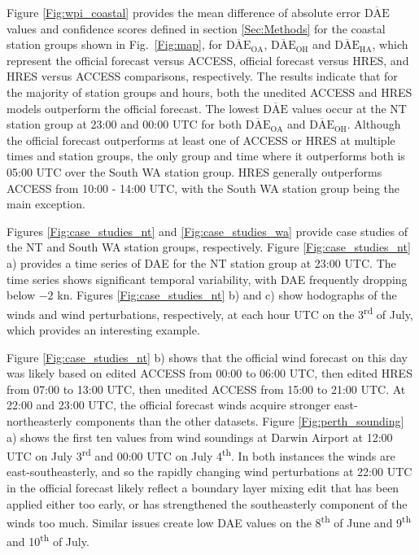 \documentclass[twocol]{ametsoc}
\begin{document}
Figure \ref{Fig:wpi_coastal} provides the mean difference of absolute error $\overline{\text{DAE}}$ values and confidence scores defined in section \ref{Sec:Methods} for the coastal station groups shown in Fig.~\ref{Fig:map}, for $\overline{\text{DAE}}_\text{OA}$, $\overline{\text{DAE}}_\text{OH}$ and $\overline{\text{DAE}}_\text{HA}$, which represent the official forecast versus ACCESS, official forecast versus HRES, and HRES versus ACCESS comparisons, respectively. The results indicate that for the majority of station groups and hours, both the unedited ACCESS and HRES models outperform the official forecast. The lowest $\overline{\text{DAE}}$ values occur at the NT station group at 23:00 and 00:00 UTC for both $\overline{\text{DAE}}_\text{OA}$ and $\overline{\text{DAE}}_\text{OH}$. Although the official forecast outperforms at least one of ACCESS or HRES at multiple times and station groups, the only group and time where it outperforms both is 05:00 UTC over the South WA station group. HRES generally outperforms ACCESS from 10:00 - 14:00 UTC, with the South WA station group being the main exception.    

Figures \ref{Fig:case_studies_nt} and \ref{Fig:case_studies_wa} provide case studies of the NT and South WA station groups, respectively. Figure \ref{Fig:case_studies_nt} a) provides a time series of DAE for the NT station group at 23:00 UTC. The time series shows significant temporal variability, with DAE frequently dropping below $-2$ kn. Figures \ref{Fig:case_studies_nt} b) and c) show hodographs of the winds and wind perturbations, respectively, at each hour UTC on the 3\textsuperscript{rd} of July, which provides an interesting example. 

Figure \ref{Fig:case_studies_nt} b) shows that the official wind forecast on this day was likely based on edited ACCESS from 00:00 to 06:00 UTC, then edited HRES from 07:00 to 13:00 UTC, then unedited ACCESS from 15:00 to 21:00 UTC. At 22:00 and 23:00 UTC, the official forecast winds acquire stronger east-northeasterly components than the other datasets. Figure \ref{Fig:perth_sounding} a) shows the first ten values from wind soundings at Darwin Airport at 12:00 UTC on July 3\textsuperscript{rd} and 00:00 UTC on July 4\textsuperscript{th}. In both instances the winds are east-southeasterly, and so the rapidly changing wind perturbations at 22:00 UTC in the official forecast likely reflect a boundary layer mixing edit that has been applied either too early, or has strengthened the southeasterly component of the winds too much. Similar issues create low DAE values on the 8\textsuperscript{th} of June and 9\textsuperscript{th} and 10\textsuperscript{th} of July.
\end{document}
